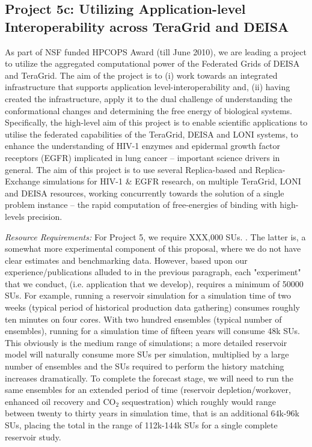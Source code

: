 \documentclass[a4paper,10pt]{article}
\begin{document}
\subsection*{Project 5c: Utilizing Application-level Interoperability across TeraGrid and DEISA}
As part of NSF funded HPCOPS Award (till June 2010), we are leading a project to utilize the aggregated computational power of the Federated Grids of DEISA and TeraGrid. The aim of the project is to (i) work towards an integrated infrastructure that supports application level-interoperability and, (ii) having created the infrastructure, apply it to the dual challenge of understanding the conformational changes and determining the free energy of biological systems. Specifically, the high-level aim of this project is to enable scientific applications to utilise the federated capabilities of the TeraGrid, DEISA and LONI systems, to enhance the understanding of HIV-1 enzymes and epidermal growth factor receptors (EGFR) implicated in lung cancer -- important science drivers in general. The aim of this project is to use several Replica-based and Replica-Exchange simulations for HIV-1 \& EGFR research, on multiple TeraGrid, LONI and DEISA resources, working concurrently towards the solution of a single problem instance -- the rapid computation of free-energies of binding with high-levels precision.

{\it Resource Requirements:} For Project 5, we require XXX,000 SUs. %
.  The latter is, a somewhat more experimental component of this proposal, where we do not have clear estimates and benchmarking data. However, based upon our experience/publications alluded to in the previous paragraph, each "experiment" that we conduct, (i.e. application that we develop), requires a minimum of 50000 SUs. For example, running a reservoir simulation for a simulation time of two weeks (typical period of historical production data gathering) consumes roughly ten minutes on four cores.  With two hundred ensembles (typical number of ensembles), running for a simulation time of fifteen years will consume 48k SUs. This obviously is the medium range of simulations; a more detailed reservoir model will naturally consume more SUs per simulation, multiplied by a large number of ensembles and the SUs required to perform the history matching increases dramatically. To complete the forecast stage, we will need to run the same ensembles for an extended period of time (reservoir depletion/workover, enhanced oil recovery and CO$_2$ sequestration) which roughly would range between twenty to thirty years in simulation time, that is an additional 64k-96k SUs, placing the total in the range of 112k-144k SUs for a single complete reservoir study.
\end{document}
